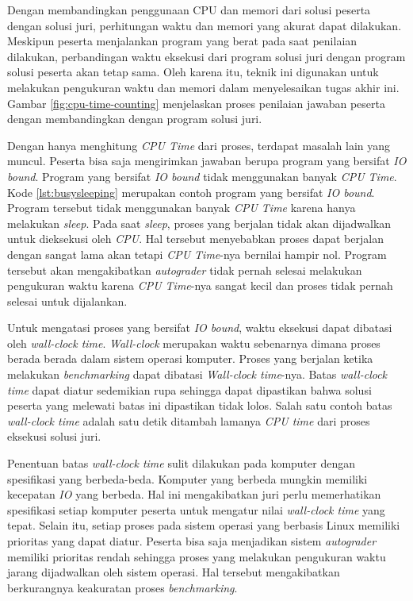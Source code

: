 \par Dengan membandingkan penggunaan CPU dan memori dari solusi peserta dengan solusi juri, perhitungan waktu dan memori yang akurat dapat dilakukan. Meskipun peserta menjalankan program yang berat pada saat penilaian dilakukan, perbandingan waktu eksekusi dari program solusi juri dengan program solusi peserta akan tetap sama. Oleh karena itu, teknik ini digunakan untuk melakukan pengukuran waktu dan memori dalam menyelesaikan tugas akhir ini. Gambar \ref{fig:cpu-time-counting} menjelaskan proses penilaian jawaban peserta dengan membandingkan dengan program solusi juri. 



\par Dengan hanya menghitung \textit{CPU Time} dari proses, terdapat masalah lain yang muncul. Peserta bisa saja mengirimkan jawaban berupa program yang bersifat \textit{IO bound}. Program yang bersifat \textit{IO bound} tidak menggunakan banyak \textit{CPU Time}. Kode \ref{lst:busysleeping} merupakan contoh program yang bersifat \textit{IO bound}. Program tersebut tidak menggunakan banyak \textit{CPU Time} karena hanya melakukan \textit{sleep}. Pada saat \textit{sleep}, proses yang berjalan tidak akan dijadwalkan untuk dieksekusi oleh \textit{CPU}. Hal tersebut menyebabkan proses dapat berjalan dengan sangat lama akan tetapi \textit{CPU Time}-nya bernilai hampir nol. Program tersebut akan mengakibatkan \textit{autograder} tidak pernah selesai melakukan pengukuran waktu karena \textit{CPU Time}-nya sangat kecil dan proses tidak pernah selesai untuk dijalankan.

\par Untuk mengatasi proses yang bersifat \textit{IO bound}, waktu eksekusi dapat dibatasi oleh \textit{wall-clock time}. \textit{Wall-clock} merupakan waktu sebenarnya dimana proses berada berada dalam sistem operasi komputer. Proses yang berjalan ketika melakukan \textit{benchmarking} dapat dibatasi \textit{Wall-clock time}-nya. Batas \textit{wall-clock time} dapat diatur sedemikian rupa sehingga dapat dipastikan bahwa solusi peserta yang melewati batas ini dipastikan tidak lolos. Salah satu contoh batas \textit{wall-clock time} adalah satu detik ditambah lamanya \textit{CPU time} dari proses eksekusi solusi juri.

\par Penentuan batas \textit{wall-clock time} sulit dilakukan pada komputer dengan spesifikasi yang berbeda-beda. Komputer yang berbeda mungkin memiliki kecepatan \textit{IO} yang berbeda. Hal ini mengakibatkan juri perlu memerhatikan spesifikasi setiap komputer peserta untuk mengatur nilai \textit{wall-clock time} yang tepat. Selain itu, setiap proses pada sistem operasi yang berbasis Linux memiliki prioritas yang dapat diatur. Peserta bisa saja menjadikan sistem \textit{autograder} memiliki prioritas rendah sehingga proses yang melakukan pengukuran waktu jarang dijadwalkan oleh sistem operasi. Hal tersebut mengakibatkan berkurangnya keakuratan proses \textit{benchmarking}.


